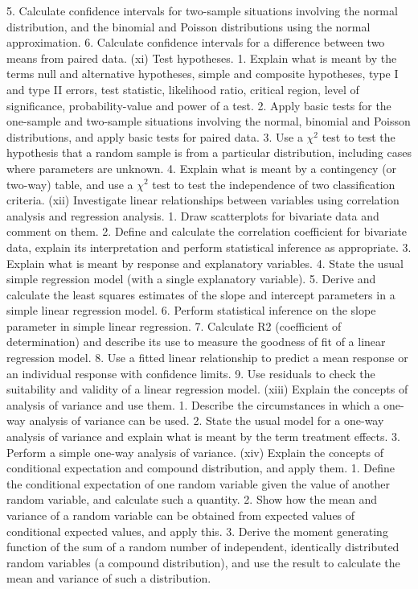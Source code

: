  5. Calculate confidence intervals for two-sample situations involving the normal distribution, and the binomial and Poisson distributions using the normal approximation.  
 6. Calculate confidence intervals for a difference between two means from paired data.  
(xi) Test hypotheses.  
 1. Explain what is meant by the terms null and alternative hypotheses, simple and composite hypotheses, type I and type II errors, test statistic, likelihood ratio, critical region, level of significance, probability-value and power of a test.  
 2. Apply basic tests for the one-sample and two-sample situations involving the normal, binomial and Poisson distributions, and apply basic tests for paired data.  
 3. Use a $\chi^2$ test to test the hypothesis that a random sample is from a particular distribution, including cases where parameters are unknown.  
 4. Explain what is meant by a contingency (or two-way) table, and use a $\chi^2$ test to test the independence of two classification criteria.  
(xii) Investigate linear relationships between variables using correlation analysis and regression analysis.  
 1. Draw scatterplots for bivariate data and comment on them.  
 2. Define and calculate the correlation coefficient for bivariate data, explain its interpretation and perform statistical inference as appropriate.  
 3. Explain what is meant by response and explanatory variables.  
 4. State the usual simple regression model (with a single explanatory variable).  
 5. Derive and calculate the least squares estimates of the slope and intercept parameters in a simple linear regression model.   
 6. Perform statistical inference on the slope parameter in simple linear regression.  
 7. Calculate R2 (coefficient of determination) and describe its use to measure the goodness of fit of a linear regression model.  
 8. Use a fitted linear relationship to predict a mean response or an individual response with confidence limits.  
 9. Use residuals to check the suitability and validity of a linear regression model. 
(xiii) Explain the concepts of analysis of variance and use them.  
1. Describe the circumstances in which a one-way analysis of variance can be used.  
 2. State the usual model for a one-way analysis of variance and explain what is meant by the term treatment effects.  
 3. Perform a simple one-way analysis of variance.  
(xiv) Explain the concepts of conditional expectation and compound distribution, and apply them.  
 1. Define the conditional expectation of one random variable given the value of another random variable, and calculate such a quantity.  
 2. Show how the mean and variance of a random variable can be obtained from expected values of conditional expected values, and apply this.  
 3. Derive the moment generating function of the sum of a random number of independent, identically distributed random variables (a compound distribution), and use the result to calculate the mean and variance of such a distribution.   
 
